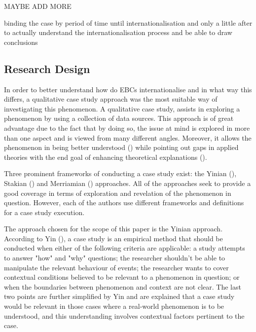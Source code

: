 \documentclass[11pt,a4paper]{article}
\begin{document}
{MAYBE ADD MORE

binding the case by period of time until internationalisation and only a little after to actually understand the internationalisation process and be able to draw conclusions

\subsection{Research Design}
In order to better understand how do EBCs internationalise and in what way this differs, a qualitative case study approach was the most suitable way of investigating this phenomenon. A qualitative case study, assists in exploring a phenomenon by using a collection of data sources. This approach is of great advantage due to the fact that by doing so, the issue at mind is explored in more than one aspect and is viewed from many different angles. Moreover, it allows the phenomenon in being better understood (\cite{baxterQualitativeCaseStudy2008}) while pointing out gaps in applied theories with the end goal of enhancing theoretical explanations (\cite{ridderCaseStudyResearch2019}). \par
Three prominent frameworks of conducting a case study exist: the Yinian (\citeyear{yinCaseStudyResearch2017}), Stakian (\citeyear{stakeArtCaseStudy1995}) and Merriamian (\citeyear{merriamQualitativeResearchCase1998}) approaches. All of the approaches seek to provide a good coverage in terms of exploration and revelation of the phenomenon in question. However, each of the authors use different frameworks and definitions for a case study execution. \par 
The approach chosen for the scope of this paper is the Yinian approach. According to Yin (\citeyear{yinCaseStudyResearch2017}), a case study is an empirical method that should be conducted when either of the following criteria are applicable: a study attempts to answer "how" and "why" questions; the researcher shouldn't be able to manipulate the relevant behaviour of events; the researcher wants to cover contextual conditions believed to be relevant to a phenomenon in question; or when the boundaries between phenomenon and context are not clear. The last two points are further simplified by Yin and are explained that a case study would be relevant in those cases where a real-world phenomenon is to be understood, and this understanding involves contextual factors pertinent to the case. \par
}
\end{document}
